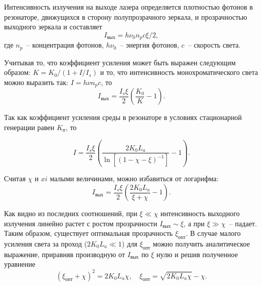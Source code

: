 
Интенсивность излучения на выходе лазера определяется плотностью фотонов в
резонаторе, движущихся в сторону полупрозрачного зеркала, и прозрачностью
выходного зеркала и составляет
\[
  I_\text{вых} = h\nu_0 n_p c\xi / 2,
\]
где \( n_p \)~-- концентрация фотонов, \( h\nu_0 \)~-- энергия фотонов,
\( c \)~-- скорость света.

Учитывая то, что коэффициент усиления может быть выражен следующим образом:
\( K = K_0 / (1 + I / I_s) \) и то, что интенсивность монохроматического света
можно выразить так: \( I = h\nu n_p c \), то
\[
  I_\text{вых} = \frac{I_s \xi}{2} \left( \frac{K_0}{K} - 1 \right).
\]

Так как коэффициент усиления среды в резонаторе в условиях стационарной
генерации равен \( K_\text{п} \), то

\begin{equation}
  I = \frac{I_s \xi}{2} \left( \frac{2K_0 L_a}{\ln\left[ (1 - \chi - \xi)^{-1}
    \right]} - 1\right).
  \label{eq_1.91}
\end{equation}

Считая \( \chi \) и \( xi \) малыми величинами, можно избавиться от логарифма:
\[
  I_\text{вых} = \frac{I_s \xi}{2} \left( \frac{2K_0 L_a}{\xi + \chi} - 1
    \right).
\]

Как видно из последних соотношений, при \( \xi \ll \chi \) интенсивность
выходного излучения линейно растет с ростом прозрачности
\( I_\text{вых} \sim \xi \), а при \( \xi \gg \chi \)~-- падает. Таким образом,
существует оптимальная прозрачность \( \xi_\text{опт} \). В случае малого
усиления света за проход (\( 2K_0 L_a \ll 1 \)) для \( \xi_\text{опт} \) можно
получить аналитическое выражение, приравняв производную от \( I_\text{вых} \) по
\( \xi \) нулю и решив полученное уравнение
\[
    (\xi_\text{опт} + \chi)^2 = 2K_0 L_a\chi, \quad
    \xi_\text{опт} = \sqrt{2K_0 L_a\chi} - \chi.
\]
